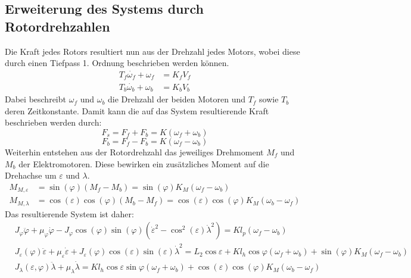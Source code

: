 \documentclass[times, 10pt,twocolumn]{article}
\begin{document}
	\subsection{Erweiterung des Systems durch Rotordrehzahlen}
	Die Kraft jedes Rotors resultiert nun aus der Drehzahl jedes Motors, wobei diese durch einen Tiefpass 1. Ordnung beschrieben werden können.
	\begin{align}
	T_f \dot{\omega_f} + \omega_f &= K_f V_f\\
	T_b \dot{\omega_b} + \omega_b &= K_b V_b
	\end{align}
	Dabei beschreibt $\omega_f$ und $\omega_b$ die Drehzahl der beiden Motoren und $T_f$ sowie $T_b$ deren Zeitkonstante.
	Damit kann die auf das System resultierende Kraft beschrieben werden durch:
	\begin{equation}
	F_s = F_f + F_b = K (\omega_f + \omega_b)
	\end{equation}
	\begin{equation}
	F_b = F_f - F_b = K (\omega_f - \omega_b)
	\end{equation}
	Weiterhin entstehen aus der Rotordrehzahl das jeweiliges Drehmoment $M_f$ und $M_b$ der Elektromotoren. Diese bewirken ein zusätzliches Moment auf die Drehachse um $\varepsilon$ und $\lambda$.
	\begin{align}
	M_{M,\varepsilon} &= \sin (\varphi) (M_f - M_b) =\sin (\varphi) K_M (\omega_f-\omega_b) \\
	M_{M,\lambda} &= \cos (\varepsilon) \cos (\varphi) (M_b - M_f) =\cos (\varepsilon) \cos (\varphi) K_M (\omega_b-\omega_f)
	\end{align}
	Das resultierende System ist daher:
	\begin{align}
	&J_\varphi \ddot{\varphi} + \mu_\varphi \dot{\varphi} - J_\varphi \cos (\varphi) \sin (\varphi) (\dot{\varepsilon}^2- \cos^2 (\varepsilon) \dot{\lambda}^2) = K l_p (\omega_f - \omega_b)\\
	&J_\varepsilon(\varphi)\ddot{\varepsilon} + \mu_\varepsilon \dot{\varepsilon} + J_\varepsilon(\varphi) \cos (\varepsilon) \sin (\varepsilon) \dot{\lambda}^2 
	= L_2 \cos \varepsilon + K l_h \cos \varphi (\omega_f + \omega_b) + \sin (\varphi) K_M (\omega_f-\omega_b)\\
	&J_\lambda(\varepsilon,\varphi) \ddot{\lambda} + \mu_\lambda \dot{\lambda} = K l_h \cos \varepsilon \sin \varphi (\omega_f + \omega_b) +\cos (\varepsilon) \cos (\varphi) K_M (\omega_b-\omega_f)
	\end{align}
\end{document}

